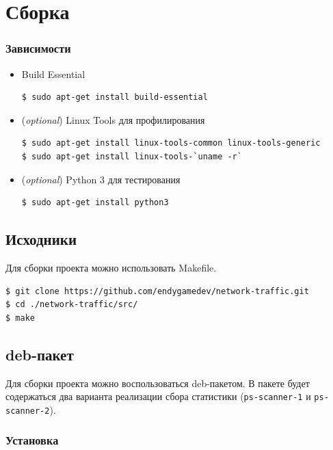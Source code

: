 \section{Сборка}


\subsubsection*{Зависимости}

\begin{itemize}
\item Build Essential
\begin{lstlisting}[language=bash]
$ sudo apt-get install build-essential
\end{lstlisting}

\item (\textit{optional}) Linux Tools для профилирования
\begin{lstlisting}
$ sudo apt-get install linux-tools-common linux-tools-generic
$ sudo apt-get install linux-tools-`uname -r`
\end{lstlisting}

\item (\textit{optional}) Python 3 для тестирования
\begin{lstlisting}
$ sudo apt-get install python3
\end{lstlisting}
\end{itemize}


\subsection{Исходники}

Для сборки проекта можно использовать Makefile.
\begin{lstlisting}
$ git clone https://github.com/endygamedev/network-traffic.git
$ cd ./network-traffic/src/
$ make
\end{lstlisting}


\subsection{deb-пакет}

Для сборки проекта можно воспользоваться deb-пакетом. В пакете будет содержаться два варианта реализации сбора статистики (\verb|ps-scanner-1| и \verb|ps-scanner-2|).

\subsubsection*{Установка}

